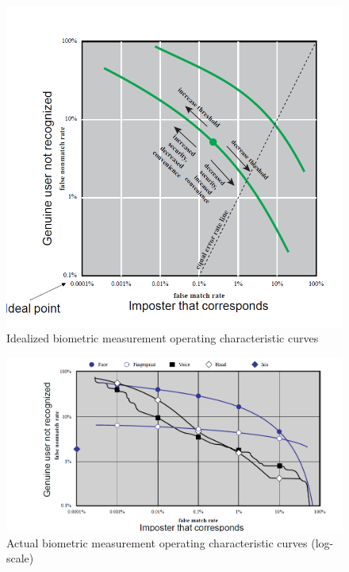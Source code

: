 \documentclass{article}
\begin{document}
                 \begin{figure}[h]
                    \begin{center}
                        \includegraphics[scale=0.5]{../immagini/Log.png}
                    \end{center}
                    \caption{Idealized
                    biometric
                    measurement
                    operating
                    characteristic
                    curves}
                \end{figure}
                 \begin{figure}[h]
                    \begin{center}
                        \includegraphics[scale=0.5]{../immagini/BiometriMesaurement.png}
                    \end{center}
                    \caption{Actual biometric measurement operating characteristic
                    curves (log-scale)}
                \end{figure}
                \newpage
\end{document}
